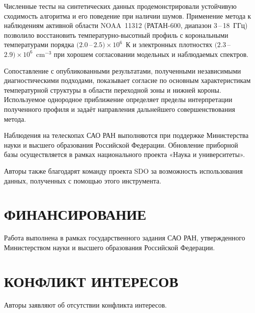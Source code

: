 \documentclass[
 aps, pra,
 amsmath,amssymb,
 11pt,
 final,
tightenlines,
 twoside,
 twocolumn,
 nofloats,
nofootinbib,
 superscriptaddress,
showkeys,
showkeywords,
 ]
{revtex4-2}
\newcommand{\as}[1]{{\color{blue} #1}}
\begin{document}
Численные тесты на синтетических данных продемонстрировали
устойчивую сходимость алгоритма и его поведение при наличии шумов.
Применение метода к наблюдениям активной области NOAA~11312
(РАТАН-600, диапазон 3\,--\,18~ГГц) позволило восстановить
температурно-высотный профиль с корональными температурами
порядка 
\as{ $(2.0$\,--\,$2.5)\times10^{6}$~К и электронных плотностях $(2.3$\,--\,$2.9)\times10^{6}$~$\mathrm{cm^{-3}}$}
при хорошем согласовании
модельных и наблюдаемых спектров.

Сопоставление с опубликованными результатами,
полученными независимыми диагностическими подходами,
показывает согласие по основным характеристикам
температурной структуры в области переходной зоны
и нижней короны. Используемое однородное приближение
определяет пределы интерпретации полученного профиля
и задаёт направления дальнейшего совершенствования метода.

\begin{acknowledgments}
{Наблюдения на телескопах САО РАН выполняются при поддержке Министерства науки и высшего образования Российской Федерации. Обновление приборной базы осуществляется в рамках национального проекта «Наука и университеты».  

Авторы также благодарят команду проекта SDO за возможность использования данных, полученных с помощью этого инструмента.
}
\end{acknowledgments}

\section*{ФИНАНСИРОВАНИЕ}
{ Работа  выполнена в рамках государственного задания САО РАН, утвержденного Министерством науки и высшего образования Российской Федерации. 
}

\section*{КОНФЛИКТ ИНТЕРЕСОВ}
Авторы заявляют об отсутствии конфликта интересов.


\newcommand{\ssr}{Space Science Reviews }



\end{document}
